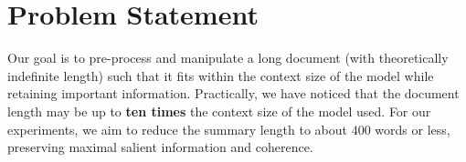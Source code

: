 \section{Problem Statement}
\label{sec:problem}

Our goal is to pre-process and manipulate a long document (with theoretically indefinite length) such that it fits within the context size of the model while retaining important information.
Practically, we have noticed that the document length may be up to \textbf{ten times} the context size of the model used.
For our experiments, we aim to reduce the summary length to about 400 words or less, preserving maximal salient information and coherence.
